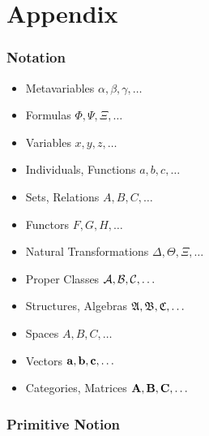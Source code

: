 \part{Appendix}\label{part:appendix}

\section{Notation}\label{sec:notation}

\begin{itemize}
  \item Metavariables $\alpha, \beta, \gamma, \ldots$
  \item Formulas $\Phi, \Psi, \Xi, \ldots$
  \item Variables $x, y, z, \ldots$
  \item Individuals, Functions $a, b, c, \ldots$
  \item Sets, Relations $A, B, C, \ldots$
  \item Functors $F, G, H, \ldots$
  \item Natural Transformations $\Delta, \Theta, \Xi, \ldots$
  \item Proper Classes $\mathcal{A}, \mathcal{B}, \mathcal{C}, \ldots$
  \item Structures, Algebras $\mathfrak{A}, \mathfrak{B}, \mathfrak{C}, \ldots$
  \item Spaces $\xspace{A}, \xspace{B}, \xspace{C}, \ldots$
  \item Vectors $\mathbf{a}, \mathbf{b}, \mathbf{c}, \ldots$
  \item Categories, Matrices $\mathbf{A}, \mathbf{B}, \mathbf{C}, \ldots$
\end{itemize}



\section{Primitive Notion}\label{sec:primitive_notion}

